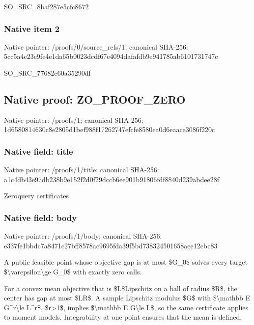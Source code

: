 \documentclass[10pt,a4paper]{article}
\begin{document}
SO\_SRC\_8baf287e5cfc8672


\subsubsection{Native item 2}


Native pointer: /proofs/0/source\_refs/1; canonical SHA-256: 5cc5a4e23e9fe4e1da65b002\allowbreak{}3dcdf67e4094dafafdb9e941\allowbreak{}785ab6101731747c


SO\_SRC\_77682e60a35290df


\subsection{Native proof: ZO\_PROOF\_ZERO}


Native pointer: /proofs/1; canonical SHA-256: 1d6580814630c8e2805d1bef\allowbreak{}988f17262747efcfe8580ea0\allowbreak{}d6eaace3086f220c



\subsubsection{Native field: title}


Native pointer: /proofs/1/title; canonical SHA-256: a1c4db43e97db238b9e152f2\allowbreak{}d0f29dccb6ee901b91806fdf\allowbreak{}8840d239abdee28f


Zeroquery certificates


\subsubsection{Native field: body}


Native pointer: /proofs/1/body; canonical SHA-256: e337fe1bbdc7a8471c27bff8\allowbreak{}578ac9695fda39f5bd738324\allowbreak{}501658aee12cbc83


A public feasible point whose objective gap is at most \$G\_0\$ solves every target \$\textbackslash{}varepsilon\textbackslash{}ge G\_0\$ with exactly zero calls.

For a convex mean objective that is \$L\$Lipschitz on a ball of radius \$R\$, the center has gap at most \$LR\$. A sample Lipschitz modulus \$G\$ with \$\textbackslash{}mathbb E G\textasciicircum{}r\textbackslash{}le L\textasciicircum{}r\$, \$r>1\$, implies \$\textbackslash{}mathbb E G\textbackslash{}le L\$, so the same certificate applies to moment models. Integrability at one point ensures that the mean is defined.
\end{document}
